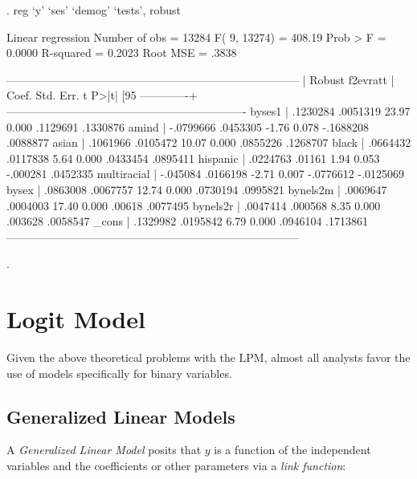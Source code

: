 \documentclass[12pt]{article}
\begin{document}
\begin{stlog}

. reg `y' `ses' `demog' `tests', robust

Linear regression                                      Number of obs =   13284
                                                       F(  9, 13274) =  408.19
                                                       Prob > F      =  0.0000
                                                       R-squared     =  0.2023
                                                       Root MSE      =   .3838

------------------------------------------------------------------------------
             |               Robust
    f2evratt |      Coef.   Std. Err.      t    P>|t|     [95%
-------------+----------------------------------------------------------------
      byses1 |   .1230284   .0051319    23.97   0.000     .1129691    .1330876
       amind |  -.0799666   .0453305    -1.76   0.078    -.1688208    .0088877
       asian |   .1061966   .0105472    10.07   0.000     .0855226    .1268707
       black |   .0664432   .0117838     5.64   0.000     .0433454    .0895411
    hispanic |   .0224763     .01161     1.94   0.053     -.000281    .0452335
 multiracial |   -.045084   .0166198    -2.71   0.007    -.0776612   -.0125069
       bysex |   .0863008   .0067757    12.74   0.000     .0730194    .0995821
    bynels2m |   .0069647   .0004003    17.40   0.000       .00618    .0077495
    bynels2r |   .0047414    .000568     8.35   0.000      .003628    .0058547
       _cons |   .1329982   .0195842     6.79   0.000     .0946104    .1713861
------------------------------------------------------------------------------

. 
\end{stlog}

\section{Logit Model}

Given the above theoretical problems with the LPM, almost all analysts
favor the use of models specifically for binary variables.

\subsection{Generalized Linear Models}

A \textit{Generalized Linear Model} posits that $y$ is a function of
the independent variables and the coefficients or other parameters via
a \textit{link function}:
\end{document}
